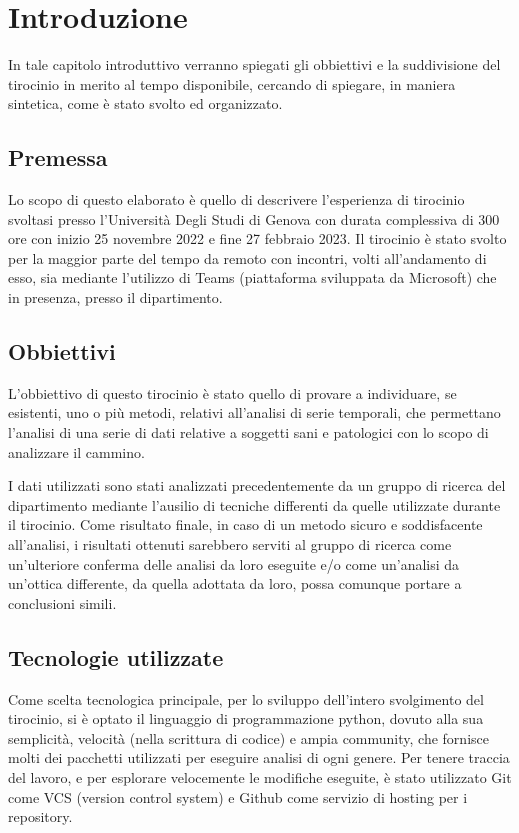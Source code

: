 \section{Introduzione}
In tale capitolo introduttivo verranno spiegati gli obbiettivi e la suddivisione 
del tirocinio in merito al tempo disponibile, cercando di spiegare, in maniera sintetica, 
come è stato svolto ed organizzato.

\subsection{Premessa}
Lo scopo di questo elaborato è quello di descrivere l'esperienza di tirocinio svoltasi presso 
l'Università Degli Studi di Genova con durata complessiva di 300 ore con inizio 25 novembre 2022
e fine 27 febbraio 2023. Il tirocinio è stato svolto per la maggior parte del tempo da remoto
con incontri, volti all'andamento di esso, sia mediante l'utilizzo di Teams 
(piattaforma sviluppata da Microsoft) che in presenza, presso il dipartimento. 

\subsection{Obbiettivi}
L'obbiettivo di questo tirocinio è stato quello di provare a individuare, se esistenti, uno o più metodi, 
relativi all'analisi di serie temporali, che permettano l'analisi di una serie di 
dati relative a soggetti sani e patologici con lo scopo di analizzare il cammino.

I dati utilizzati sono stati analizzati precedentemente da un gruppo di ricerca del dipartimento
mediante l'ausilio di tecniche differenti da quelle utilizzate durante il tirocinio.
Come risultato finale, in caso di un metodo sicuro e soddisfacente all'analisi, i risultati ottenuti sarebbero
serviti al gruppo di ricerca come un'ulteriore conferma delle analisi da loro eseguite e/o come 
un'analisi da un'ottica differente, da quella adottata da loro, possa comunque portare a conclusioni
simili.

\subsection{Tecnologie utilizzate}
\begin{sloppypar}
Come scelta tecnologica principale, per lo sviluppo dell'intero svolgimento del tirocinio, si è optato
il linguaggio di
programmazione python, dovuto alla sua semplicità, velocità (nella scrittura di codice) e
ampia community, che fornisce molti dei pacchetti utilizzati per eseguire analisi di ogni genere.
Per tenere traccia del lavoro, e per esplorare velocemente le modifiche eseguite, è stato utilizzato
Git come VCS (version control system) e Github come servizio di hosting per i repository.
\end{sloppypar}


